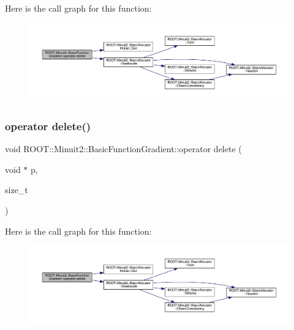 Here is the call graph for this function\+:
\nopagebreak
\begin{figure}[H]
\begin{center}
\leavevmode
\includegraphics[width=350pt]{db/d85/classROOT_1_1Minuit2_1_1BasicFunctionGradient_acc4585a778dae54497b4c4342a4dcd1e_cgraph}
\end{center}
\end{figure}
\mbox{\label{classROOT_1_1Minuit2_1_1BasicFunctionGradient_acc4585a778dae54497b4c4342a4dcd1e}} 
\subsubsection{\texorpdfstring{operator delete()}{operator delete()}\hspace{0.1cm}{\footnotesize\ttfamily [2/2]}}
{\footnotesize\ttfamily void R\+O\+O\+T\+::\+Minuit2\+::\+Basic\+Function\+Gradient\+::operator delete (\begin{DoxyParamCaption}\item[{void $\ast$}]{p,  }\item[{size\+\_\+t}]{ }\end{DoxyParamCaption})\hspace{0.3cm}{\ttfamily [inline]}}

Here is the call graph for this function\+:
\nopagebreak
\begin{figure}[H]
\begin{center}
\leavevmode
\includegraphics[width=350pt]{db/d85/classROOT_1_1Minuit2_1_1BasicFunctionGradient_acc4585a778dae54497b4c4342a4dcd1e_cgraph}
\end{center}
\end{figure}
\mbox{\label{classROOT_1_1Minuit2_1_1BasicFunctionGradient_a2b08ebb0074a43cfca91f74991c660d5}} 
